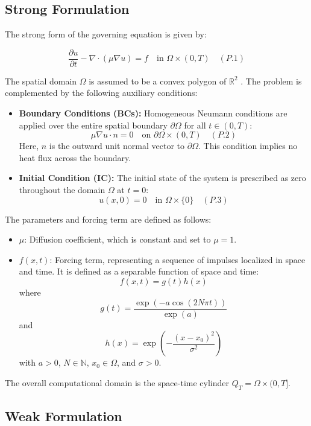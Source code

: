\documentclass[
  11pt,
]{article}
\providecommand{\tightlist}{%
  \setlength{\itemsep}{0pt}\setlength{\parskip}{0pt}}
\begin{document}
\subsection{Strong Formulation}

The strong form of the governing equation is given by:

\[
\frac{\partial u}{\partial t} - \nabla \cdot (\mu \nabla u) = f \quad \text{in } \Omega \times (0, T) \quad (P.1)
\]

The spatial domain $\Omega$ is assumed to be a convex polygon of
$\mathbb{R}^2$ \cite{picasso1998}. The problem is complemented by the following
auxiliary conditions:

\begin{itemize}
\item
  \textbf{Boundary Conditions (BCs):} Homogeneous Neumann conditions are
  applied over the entire spatial boundary $\partial \Omega$ for all
  $t \in (0, T)$: \[
  \mu \nabla u \cdot n = 0 \quad \text{on } \partial\Omega \times (0, T) \quad (P.2)
  \] Here, $n$ is the outward unit normal vector to
  $\partial\Omega$. This condition implies no heat flux across the
  boundary.
\item
  \textbf{Initial Condition (IC):} The initial state of the system is
  prescribed as zero throughout the domain $\Omega$ at $t=0$: \[
  u(x, 0) = 0 \quad \text{in } \Omega \times \{0\} \quad (P.3)
  \]
\end{itemize}

The parameters and forcing term are defined as follows:

\begin{itemize}
\tightlist
\item
  $\mu$: Diffusion coefficient, which is constant and set to
  $\mu = 1$.
\item
  $f(x, t)$: Forcing term, representing a sequence of impulses
  localized in space and time. It is defined as a separable function of
  space and time: \[
  f(x, t) = g(t)h(x)
  \] where \[
  g(t) = \frac{\exp(-a \cos(2 N \pi t))}{\exp(a)}
  \] and \[
  h(x) = \exp\left(-\frac{(x - x_0)^2}{\sigma^2}\right)
  \] with $a > 0$, $N \in \mathbb{N}$, $x_0 \in \Omega$, and
  $\sigma > 0$.
\end{itemize}

The overall computational domain is the space-time cylinder
$Q_T = \Omega \times (0, T]$.

\subsection{Weak Formulation}
\end{document}
